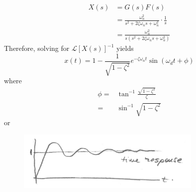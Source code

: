 \documentclass[12pt,letter]{article}
\numberwithin{ex}{section} %
\numberwithin{re}{section} %
\newcommand{\Laplace}[1]{\ensuremath{\mathcal{L}{\left[#1\right]}}}
\numberwithin{equation}{section}	%
\begin{document}
\begin{align}
X(s) &= G(s)F(s) \\
&= \frac{\omega_n^2}{s^2 + 2 \zeta \omega_n s + \omega_n^2} \cdot \frac{1}{s} \nonumber \\
&=  \frac{\omega_n^2}{s(s^2 + 2 \zeta \omega_n s + \omega_n^2)}
\end{align}
Therefore, solving for $\Laplace{X(s)}^{-1}$ yields
\begin{equation}
x(t) = 1 - \frac{1}{\sqrt{1-\zeta^2}}e^{-\zeta \omega_n t} \sin(\omega_dt+\phi)
\end{equation}
where
\begin{align}
\phi =& \tan^{-1}\frac{\sqrt{1-\zeta^2}}{\zeta} \\
=& \sin^{-1}\sqrt{1-\zeta^2}  \nonumber
\end{align}
or
\begin{figure}[H]
	\centering
	\includegraphics[width=3.5in]{../figures/x_t_time_response_2nd_order_step}
\end{figure}
\end{document}
